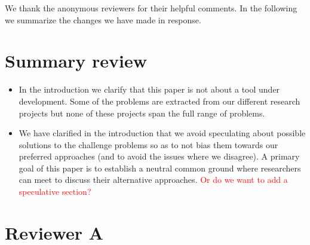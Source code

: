 \documentclass{article}
\begin{document}
We thank the anonymous reviewers for their helpful comments. In the following we summarize the changes we have made in response.

\section{Summary review}

\begin{itemize}
\item In the introduction we clarify that this paper is not about a tool under development. Some of the problems are extracted from our different research projects but none of these projects span the full range of problems.

\item We have clarified in the introduction that we avoid speculating about possible solutions to the challenge problems so as to not bias them towards our preferred approaches (and to avoid the issues where we disagree). A primary goal of this paper is to establish a neutral common ground where researchers can meet to discuss their alternative approaches.
\textcolor{red}{Or do we want to add a speculative section?}
\end{itemize}

\section{Reviewer A}
\end{document}
